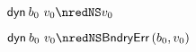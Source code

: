 {\begin{lamportproof*}
    \begin{pfproof}
      \qedstep
        \begin{pfproof}
          $\edynb{\sbnd_0}{\svalue_0} \nredNS \svalue_0$
        \end{pfproof}
    \end{pfproof}

    \begin{pfproof}
      \qedstep
        \begin{pfproof}
          $\edynb{\sbnd_0}{\svalue_0} \nredNS \boundaryerror{\sbnd_0}{\svalue_0}$
        \end{pfproof}
    \end{pfproof}

\end{lamportproof*}}


